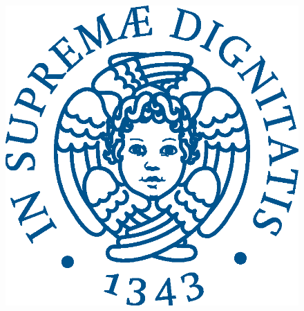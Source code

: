\begin{titlepage}
    \begin{figure}[!htb]
        \centering
        \includegraphics[keepaspectratio=true,scale=0.5]{00-frontespizio/cherubinFrontespizio}
    \end{figure}


\end{titlepage}
